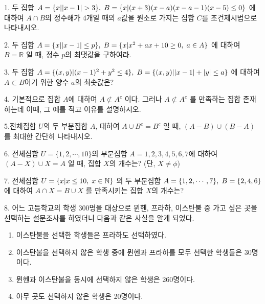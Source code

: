 \documentclass[paper=a4, fontsize=11pt]{scrartcl} %
\numberwithin{equation}{section} %
\numberwithin{figure}{section} %
\numberwithin{table}{section} %
\theoremstyle{plain}
\newcommand{\Com}{,\Hs}
\newcommand{\Hs}{\hspace{0.1cm}}
\newcommand{\nsubset}{\not\subset}
\newcommand{\Set}[1]{\{ #1 \}}
\newcommand{\CSet}[2][x]{\{#1 | #2 \}}
\newcommand{\A}{$A$}
\newcommand{\B}{$B$}
\newcommand{\N}{\mathbb{N}}
\newcommand{\R}{\mathbb{R}}
\begin{document}
1. 두 집합 $A=\CSet{|x-1|>3}\Com B=\CSet{(x+3)(x-a)(x-a-1)(x-5) \leq 0}$ 에 대하여 $A\cap B$의 정수해가 4개일 때의
$a$값을 원소로 가지는 집합 $C$를 조건제시법으로 나타내시오.

\vspace{5cm}

2. 두 집합 $A=\CSet{|x-1| \leq p}\Com B=\CSet{x^2 + ax + 10 \geq 0 \Com a\in A}$ 에 대하여 $B = \R$ 일 때, 정수 $p$의 최댓값을 구하여라.

\vspace{3cm}

3. 두 집합 $A=\CSet[(x,y)]{(x-1)^2 + y^2 \leq 4}\Com B=\CSet[(x,y)]{|x-1|+|y| \leq a}$ 에 대하여 $A\subset B$이기 위한 양수 $a$의 최솟값은?

\vspace{3cm}

4. 기본적으로 집합 \A 에 대하여 $A \nsubset A^c$ 이다. 그러나 $A \nsubset A^c$ 를 만족하는 집합  존재하는데 이때, 그 예를 적고 이유를 설명하시오.

\vspace{3cm}

5.전체집합 $U$의 두 부분집합 \A,  대하여 $A\cup B^c = B^c$ 일 때, $(A-B)\cup (B-A)$ 를 최대한 간단히 나타내시오.

\pagebreak
6. 전체집합 $U=\Set{1,2,\cdots ,10}$의 부분집합 $A={1,2,3,4,5,6,7}$에 대하여 $(A-X)\cup X = A$ 일 때, 집합 $X$의 개수는? (단, $X\neq \phi$)

\vspace{3cm}

7. 전체집합 $U=\CSet{x \leq 10 \Com x\in \N}$ 의 두 부분집합 $A=\Set{1,2,\cdots ,7}\Com B=\Set{2,4,6}$에 대하여 \linebreak $A\cap X = B \cup X$ 를 만족시키는 집합 $X$의 개수는?

\vspace{3cm}

8. 어느 고등학교의 학생 300명을 대상으로 뮌헨, 프라하, 이스탄불 중 가고 싶은 곳을 선택하는 설문조사를 하였더니 다음과 같은 사실을 알게 되었다.

\begin{enumerate}
 \item 이스탄불을 선택한 학생들은 프라하도 선택하였다.
 \item 이스탄불을 선택하지 않은 학생 중에 뮌헨과 프라하를 모두 선택한 학생들은 30명이다.
 \item 뮌헨과 이스탄불을 동시에 선택하지 않은 학생은 260명이다.
 \item 아무 곳도 선택하지 않은 학생은 20명이다.
\end{enumerate}
\end{document}

